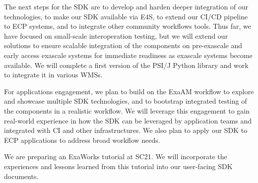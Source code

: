 The next steps for the SDK are to develop and harden deeper integration of our
technologies, to make our SDK available via E4S,
 to extend our CI/CD pipeline to ECP systems, and to integrate
other community workflows tools. Thus far, we have focused on small-scale
interoperation testing, but we will extend our solutions to ensure scalable
integration of the components on pre-exascale and early access exascale
systems for immediate readiness as exascale systems become available. 
We will complete a first version of the PSI/J  Python library and work 
to integrate it in various WMSs. 

For applications engagement, we plan to build on the ExaAM workflow to explore
and showcase multiple SDK technologies, and to bootstrap integrated testing of
the components in a realistic workflow. We will leverage this engagement to
gain real-world experience in how the SDK can be leveraged by application teams
and integrated with CI and other infrastructures.  We also plan to apply our
SDK to ECP applications to address broad workflow needs.

We are preparing 
an ExaWorks tutorial at SC21. We will incorporate the
experiences and lessons learned from this tutorial into our
user-facing SDK documents.
